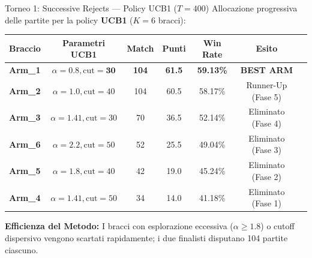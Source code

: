 \documentclass[10pt]{beamer}
\begin{document}
\begin{frame}{Torneo 1: Successive Rejects — Policy UCB1 ($T=400$)}
    Allocazione progressiva delle partite per la policy \textbf{UCB1} ($K=6$ bracci):
    
    \vspace{0.2cm}
    \centering
    \small
    \begin{tabular}{lcccccl}
        \toprule
        \textbf{Braccio} & \textbf{Parametri UCB1} & \textbf{Match} & \textbf{Punti} & \textbf{Win Rate} & \textbf{Esito} \\
        \midrule
        \textbf{Arm\_1} & $\alpha = \mathbf{0.8}, \text{cut} = \mathbf{30}$ & \textbf{104} & \textbf{61.5} & \textbf{59.13\%} & \textbf{BEST ARM} \\
        \textbf{Arm\_2} & $\alpha = 1.0, \text{cut} = 40$ & 104 & 60.5 & 58.17\% & Runner-Up (Fase 5) \\
        \textbf{Arm\_3} & $\alpha = 1.41, \text{cut} = 30$ & 70 & 36.5 & 52.14\% & Eliminato (Fase 4) \\
        \textbf{Arm\_6} & $\alpha = 2.2, \text{cut} = 50$ & 52 & 25.5 & 49.04\% & Eliminato (Fase 3) \\
        \textbf{Arm\_5} & $\alpha = 1.8, \text{cut} = 40$ & 42 & 19.0 & 45.24\% & Eliminato (Fase 2) \\
        \textbf{Arm\_4} & $\alpha = 1.41, \text{cut} = 50$ & 34 & 14.0 & 41.18\% & Eliminato (Fase 1) \\
        \bottomrule
    \end{tabular}
    
    \vspace{0.3cm}
    \raggedright
    \footnotesize
    \textbf{Efficienza del Metodo:} I bracci con esplorazione eccessiva ($\alpha \ge 1.8$) o cutoff dispersivo vengono scartati rapidamente; i due finalisti disputano 104 partite ciascuno.
\end{frame}
\end{document}
